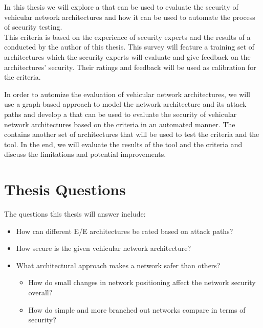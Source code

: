 In this thesis we will explore a  that can be used to evaluate the security of vehicular network architectures and how it can be used to automate the process of security testing.\\
This criteria is based on the experience of security experts and the results of a  conducted by the author of this thesis.
This survey will feature a training set of architectures which the security experts will evaluate and give feedback on the architectures' security.
Their ratings and feedback will be used as calibration for the criteria.\par
In order to automize the evaluation of vehicular network architectures, we will use a graph-based approach to model the network architecture and its attack paths
and develop a  that can be used to evaluate the security of vehicular network architectures based on the criteria in an automated manner.
The  contains another set of architectures that will be used to test the criteria and the tool.
In the end, we will evaluate the results of the tool and the criteria and discuss the limitations and potential improvements.

\section{Thesis Questions}
\label{sec:thesis-questions}

The questions this thesis will answer include:

\begin{itemize}
    \item How can different E/E architectures be rated based on attack paths?
    \item How secure is the given vehicular network architecture?
    \item What architectural approach makes a network safer than others?
    \begin{itemize}
        \item How do small changes in network positioning affect the network security overall?
        \item How do simple and more branched out networks compare in terms of security?
    \end{itemize}
\end{itemize}